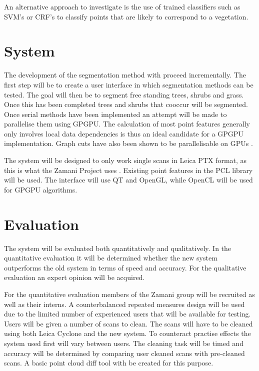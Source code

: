 \documentclass[10pt,twocolumn]{article}
\begin{document}
An alternative approach to investigate is the use of trained classifiers such as SVM's or CRF's to classify points that are likely to correspond to a vegetation.


\section{System}

The development of the segmentation method with proceed incrementally. The first step will be to create a user interface in which segmentation methods can be tested. The goal will then be to segment free standing trees, shrubs and grass. Once this has been completed trees and shrubs that cooccur will be segmented. Once serial methods have been implemented an attempt will be made to parallelise them using GPGPU. The calculation of most point features generally only involves local data dependencies is thus an ideal candidate for a GPGPU implementation. Graph cuts have also been shown to be parallelisable on GPUs \cite{Hussein2007}.

The system will be designed to only work single scans in Leica PTX format, as this is what the Zamani Project uses \cite{Held2012}. Existing point features in the PCL library \cite{Rusu2011} will be used. The interface will use QT and OpenGL, while OpenCL will be used for GPGPU algorithms.

\section{Evaluation}

The system will be evaluated both quantitatively and qualitatively. In the quantitative evaluation it will be determined whether the new system outperforms the old system in terms of speed and accuracy. For the qualitative evaluation an expert opinion will be acquired.

For the quantitative evaluation members of the Zamani group will be recruited as well as their interns. A counterbalanced repeated measures design will be used due to the limited number of experienced users that will be available for testing. Users will be given a number of scans to clean. The scans will have to be cleaned using both Leica Cyclone and the new system. To counteract practise effects the system used first will vary between users. The cleaning task will be timed and accuracy will be determined by comparing user cleaned scans with pre-cleaned scans. A basic point cloud diff tool with be created for this purpose.
\end{document}
